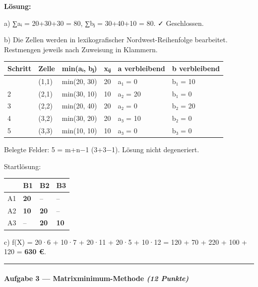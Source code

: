 \documentclass[11pt, a4paper]{article}
\begin{document}
\textbf{Lösung:}


a) ∑aᵢ = 20+30+30 = 80, ∑bⱼ = 30+40+10 = 80. ✓ Geschlossen.


b) Die Zellen werden in lexikografischer Nordwest-Reihenfolge bearbeitet. Restmengen jeweils nach Zuweisung in Klammern.



{\small
\begin{tabularx}{\linewidth}{XXXXXX}
\hline
\rowcolor{tableheadbg}
{\color{white}\textbf{Schritt}} & {\color{white}\textbf{Zelle}} & {\color{white}\textbf{min(aᵢ, bⱼ)}} & {\color{white}\textbf{xᵢⱼ}} & {\color{white}\textbf{a verbleibend}} & {\color{white}\textbf{b verbleibend}} \\[2pt]
\hline
\endhead
\hline
\endfoot
1 & (1,1) & min(20, 30) & 20 & a₁ = 0 & b₁ = 10 \\
2 & (2,1) & min(30, 10) & 10 & a₂ = 20 & b₁ = 0 \\
3 & (2,2) & min(20, 40) & 20 & a₂ = 0 & b₂ = 20 \\
4 & (3,2) & min(30, 20) & 20 & a₃ = 10 & b₂ = 0 \\
5 & (3,3) & min(10, 10) & 10 & a₃ = 0 & b₃ = 0 \\
\end{tabularx}
}


Belegte Felder: 5 = m+n−1 (3+3−1). Lösung nicht degeneriert.


Startlösung:



{\small
\begin{tabularx}{\linewidth}{XXXX}
\hline
\rowcolor{tableheadbg}
{\color{white}\textbf{}} & {\color{white}\textbf{B1}} & {\color{white}\textbf{B2}} & {\color{white}\textbf{B3}} \\[2pt]
\hline
\endhead
\hline
\endfoot
A1 & \textbf{20} & – & – \\
A2 & \textbf{10} & \textbf{20} & – \\
A3 & – & \textbf{20} & \textbf{10} \\
\end{tabularx}
}


c) f(X) = 20·6 + 10·7 + 20·11 + 20·5 + 10·12 = 120 + 70 + 220 + 100 + 120 = \textbf{630 €}.



\noindent\textcolor{rulegray}{\rule{\linewidth}{0.4pt}}


\paragraph{Aufgabe 3 — Matrixminimum-Methode \textit{(12 Punkte)}}\mbox{}\\[2pt]
\end{document}
